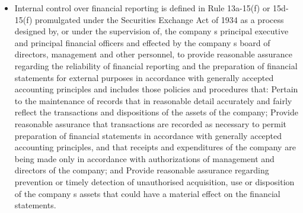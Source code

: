\begin{itemize}
    \item Internal control over financial reporting is defined in Rule 13a-15(f) or 15d-15(f) promulgated under the Securities Exchange Act of 1934 as a process designed by, or under the supervision of, the company s principal executive and principal financial officers and effected by the company s board of directors, management and other personnel, to provide reasonable assurance regarding the reliability of financial reporting and the preparation of financial statements for external purposes in accordance with generally accepted accounting principles and includes those policies and procedures that: Pertain to the maintenance of records that in reasonable detail accurately and fairly reflect the transactions and dispositions of the assets of the company; Provide reasonable assurance that transactions are recorded as necessary to permit preparation of financial statements in accordance with generally accepted accounting principles, and that receipts and expenditures of the company are being made only in accordance with authorizations of management and directors of the company; and Provide reasonable assurance regarding prevention or timely detection of unauthorised acquisition, use or disposition of the company s assets that could have a material effect on the financial statements.

\end{itemize}
